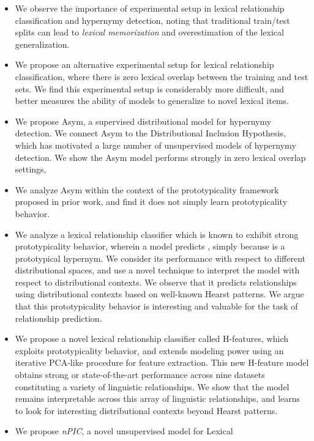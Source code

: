\begin{itemize}
  \item We observe the importance of experimental setup in lexical relationship
    classification and hypernymy detection, noting that traditional train/test
    splits can lead to {\em lexical memorization} and overestimation of the
    lexical generalization.
  \item We propose an alternative experimental setup for lexical relationship
    classification, where there is zero lexical overlap between the training
    and test sets. We find this experimental setup is considerably more
    difficult, and better measures the ability of models to generalize to
    novel lexical items.
  \item We propose Asym, a supervised distributional model for hypernymy
    detection. We connect Asym to the Distributional Inclusion Hypothesis, which
    has motivated a large number of unsupervised models of hypernymy detection.
    We show the Asym model performs strongly in zero lexical overlap settings,
  \item We analyze Asym within the context of the prototypicality framework
    proposed in prior work, and find it does not simply learn prototypicality
    behavior.
  \item We analyze a lexical relationship classifier which is known to exhibit
    strong prototypicality behavior, wherein a model predicts , simply because  is a prototypical
    hypernym. We consider its performance with respect to different
    distributional spaces, and use a novel technique to interpret the model
    with respect to distributional contexts. We observe that it predicts
    relationships using distributional contexts based on well-known Hearst
    patterns. We argue that this prototypicality behavior is interesting and
    valuable for the task of relationship prediction.
  \item We propose a novel lexical relationship classifier called H-features,
    which exploits prototypicality behavior, and extends modeling power
    using an iterative PCA-like procedure for feature extraction. This new
    H-feature model obtains strong or state-of-the-art performance across
    nine datasets constituting a variety of linguistic relationships.
    We show that the model remains interpretable across this
    array of linguistic relationships, and learns to look for interesting
    distributional contexts beyond Hearst patterns.
  \item We propose {\em nPIC}, a novel unsupervised model for Lexical

\end{itemize}
